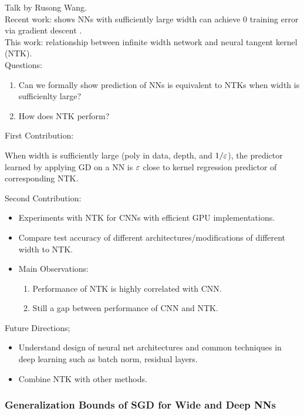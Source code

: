 Talk by Rusong Wang. \\

Recent work: shows NNs with sufficiently large width can achieve 0 training error via gradient descent \cite{allen2019learning, du2018power}. \\

This work: relationship between infinite width network and neural tangent kernel (NTK). \\

Questions:
\begin{enumerate}
    \item Can we formally show prediction of NNs is equivalent to NTKs when width is sufficienlty large?
    \item How does NTK perform?
\end{enumerate}

First Contribution:
\begin{theorem}
When width is sufficiently large (poly in data, depth, and $1/\varepsilon$), the predictor learned by applying GD on a NN is $\varepsilon$ close to kernel regression predictor of corresponding NTK.
\end{theorem}

Second Contribution:
\begin{itemize}
    \item Experiments with NTK for CNNs with efficient GPU implementations.
    \item Compare test accuracy of different architectures/modifications of different width to NTK.
    \item Main Observations:
    \begin{enumerate}
        \item Performance of NTK is highly correlated with CNN.
        \item Still a gap between performance of CNN and NTK.
    \end{enumerate}
\end{itemize}

Future Directions;
\begin{itemize}
    \item Understand design of neural net architectures and common techniques in deep learning such as batch norm, residual layers.
    \item Combine NTK with other methods.
\end{itemize}

\spacerule
\subsubsection{Generalization Bounds of SGD for Wide and Deep NNs \cite{cao2019generalization}}

